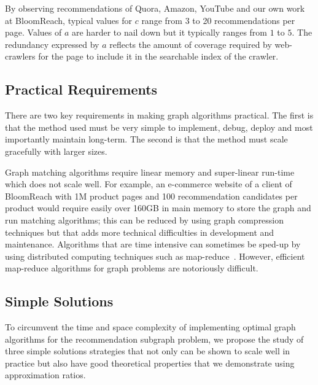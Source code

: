 By observing recommendations of Quora, Amazon, YouTube and our own
work at BloomReach, typical values for $c$ range from 3 to 20
recommendations per page. Values of $a$ are harder to nail down but it
typically ranges from $1$ to $5$. The redundancy expressed by $a$
reflects the amount of coverage required by web-crawlers for the page
to include it in the searchable index of the crawler. \vs

\subsection{Practical Requirements}

There are two key requirements in making graph algorithms
practical. The first is that the method used must be very simple to
implement, debug, deploy and most importantly maintain long-term. The second is that the method must scale
gracefully with larger sizes. \vs

Graph matching algorithms require linear memory and super-linear run-time
which does not scale well. For example, an e-commerce website of a
client of BloomReach with 1M product pages and 100 recommendation
candidates per product would require easily over 160GB in main memory to store the graph
and run matching algorithms; this can be reduced by using graph
compression techniques but that adds more technical difficulties in
development and maintenance. Algorithms that are time intensive
can sometimes be sped-up by using distributed computing techniques such as
map-reduce~\cite{DeanGhemawat2004}. However, efficient map-reduce
algorithms for graph problems are notoriously difficult. \vs

\subsection{Simple Solutions}

To circumvent the time and space complexity of implementing optimal
graph algorithms for the recommendation subgraph problem, we propose
the study of three simple solutions strategies that not only can be
shown to scale well in practice but also have good theoretical
properties that we demonstrate using approximation ratios.

